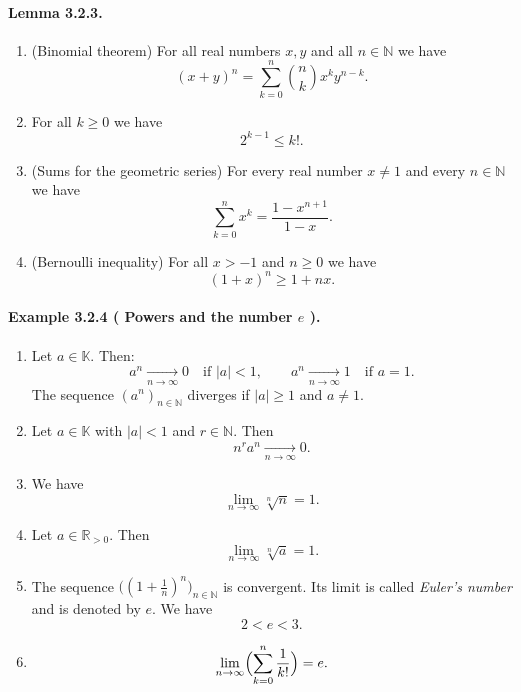 \documentclass[12pt]{article}
\newcommand{\N}{\mathbb{N}}
\newcommand{\R}{\mathbb{R}}
\newcommand{\K}{\mathbb{K}} %
\newcommand{\NumberedExample}[3]{%
\paragraph*{Example #1 ( #2 ).} #3\par}
\begin{document}
\paragraph*{Lemma 3.2.3.}
\begin{enumerate}[label=(\arabic*),leftmargin=*]
    \item (Binomial theorem) For all real numbers $x,y$ and all $n\in\N$ we have
    \[
        (x+y)^n = \sum_{k=0}^{n} \binom{n}{k} x^k y^{n-k}.
    \]

    \item For all $k\ge 0$ we have
    \[
        2^{k-1} \le k!.
    \]

    \item (Sums for the geometric series) For every real number $x\ne 1$ and every $n\in\N$ we have
    \[
        \sum_{k=0}^{n} x^k = \frac{1-x^{n+1}}{1-x}.
    \]

    \item (Bernoulli inequality) For all $x>-1$ and $n\ge 0$ we have
    \[
        (1+x)^n \ge 1 + n x.
    \]
\end{enumerate}

\NumberedExample{3.2.4}{Powers and the number $e$}{
\begin{enumerate}[label=(\arabic*),leftmargin=*]
    \item Let $a\in\K$. Then:
    \[
        a^n \xrightarrow[n\to\infty]{} 0 \quad\text{if } |a|<1,\qquad
        a^n \xrightarrow[n\to\infty]{} 1 \quad\text{if } a=1.
    \]
    The sequence $(a^n)_{n\in\N}$ diverges if $|a|\ge 1$ and $a\ne 1$.

    \item Let $a\in\K$ with $|a|<1$ and $r\in\N$. Then
    \[
        n^r a^n \xrightarrow[n\to\infty]{} 0.
    \]

    \item We have
    \[
        \lim_{n\to\infty} \sqrt[n]{n} = 1.
    \]

    \item Let $a\in\R_{>0}$. Then
    \[
        \lim_{n\to\infty} \sqrt[n]{a} = 1.
    \]

    \item The sequence $\bigl((1+\tfrac1n)^n\bigr)_{n\in\N}$ is convergent. Its limit is called \emph{Euler’s number} and is denoted by $e$. We have
    \[
        2<e<3.
    \]

    \item
    \[
        \lim_{n\to\infty} \Bigl(\sum_{k=0}^{n} \frac1{k!}\Bigr) = e.
    \]
\end{enumerate}
}
\end{document}

